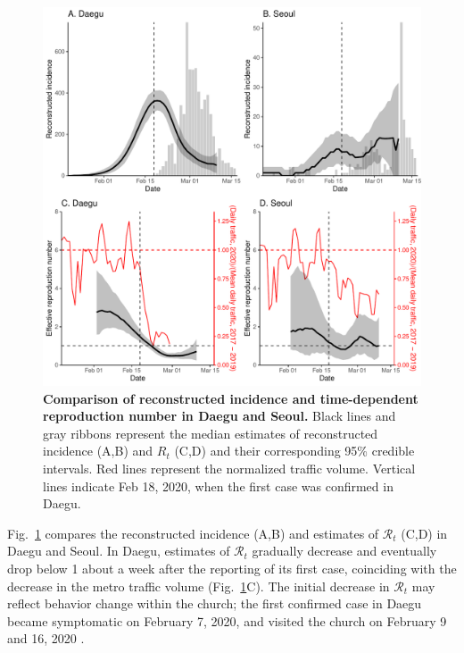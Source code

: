 \documentclass[12pt]{article}
\newcommand{\fref}[1]{Fig.~\ref{fig:#1}}
\begin{document}
\begin{figure}[!ht]
\includegraphics[width=\textwidth]{figure_compare_R_t.pdf}
\caption{
\textbf{Comparison of reconstructed incidence and time-dependent reproduction number in Daegu and Seoul.}
Black lines and gray ribbons represent the median estimates of reconstructed incidence (A,B) and $R_t$ (C,D) and their corresponding 95\% credible intervals.
Red lines represent the normalized traffic volume.
Vertical lines indicate Feb 18, 2020, when the first case was confirmed in Daegu.
}
\label{fig:eff}
\end{figure}

\fref{eff} compares the reconstructed incidence (A,B) and estimates of $\mathcal R_t$ (C,D) in Daegu and Seoul.
In Daegu, estimates of $\mathcal R_t$ gradually decrease and eventually drop below 1 about a week after the reporting of its first case, coinciding with the decrease in the metro traffic volume (\fref{eff}C).
The initial decrease in $\mathcal R_t$ may reflect behavior change within the church; the first confirmed case in Daegu became symptomatic on February 7, 2020, and visited the church on February 9 and 16, 2020 \citep{kcdc}.
\end{document}
